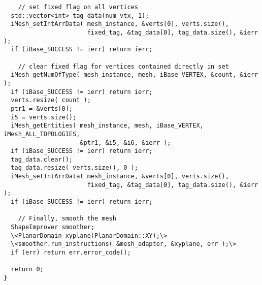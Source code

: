 \begin{lstlisting}
    // set fixed flag on all vertices
  std::vector<int> tag_data(num_vtx, 1);
  iMesh_setIntArrData( mesh_instance, &verts[0], verts.size(), 
                       fixed_tag, &tag_data[0], tag_data.size(), &ierr );
  if (iBase_SUCCESS != ierr) return ierr;

    // clear fixed flag for vertices contained directly in set
  iMesh_getNumOfType( mesh_instance, mesh, iBase_VERTEX, &count, &ierr );
  if (iBase_SUCCESS != ierr) return ierr;
  verts.resize( count );
  ptr1 = &verts[0];
  i5 = verts.size();
  iMesh_getEntities( mesh_instance, mesh, iBase_VERTEX, iMesh_ALL_TOPOLOGIES,
                     &ptr1, &i5, &i6, &ierr );
  if (iBase_SUCCESS != ierr) return ierr;
  tag_data.clear();
  tag_data.resize( verts.size(), 0 );
  iMesh_setIntArrData( mesh_instance, &verts[0], verts.size(), 
                       fixed_tag, &tag_data[0], tag_data.size(), &ierr );
  if (iBase_SUCCESS != ierr) return ierr;

    // Finally, smooth the mesh
  ShapeImprover smoother;
  \<PlanarDomain xyplane(PlanarDomain::XY);\>
  \<smoother.run_instructions( &mesh_adapter, &xyplane, err );\>
  if (err) return err.error_code();

  return 0;
}
\end{lstlisting}


